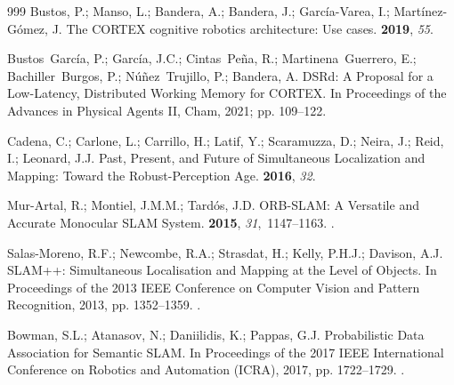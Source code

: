 \documentclass[10pt,a4paper]{article}
\begin{document}
\begin{thebibliography}{999}
Bustos, P.; Manso, L.; Bandera, A.; Bandera, J.; García-Varea, I.;
  Martínez-Gómez, J.
\newblock The {CORTEX} cognitive robotics architecture: {Use} cases.
 {\bf 2019}, {\em 55}.

Bustos~García, P.; Garc{\'i}a, J.C.; Cintas~Peña, R.; Martinena~Guerrero, E.;
  Bachiller~Burgos, P.; Núñez~Trujillo, P.; Bandera, A.
\newblock DSRd: A Proposal for a Low-Latency, Distributed Working Memory for
  CORTEX.
\newblock In Proceedings of the Advances in Physical Agents II, Cham,  2021;
  pp. 109--122.

Cadena, C.; Carlone, L.; Carrillo, H.; Latif, Y.; Scaramuzza, D.; Neira, J.;
  Reid, I.; Leonard, J.J.
\newblock Past, Present, and Future of Simultaneous Localization and Mapping:
  Toward the Robust-Perception Age.
 {\bf 2016}, {\em 32}.

Mur-Artal, R.; Montiel, J.M.M.; Tardós, J.D.
\newblock ORB-SLAM: A Versatile and Accurate Monocular SLAM System.
 {\bf 2015}, {\em 31},~1147--1163.
.

Salas-Moreno, R.F.; Newcombe, R.A.; Strasdat, H.; Kelly, P.H.J.; Davison, A.J.
\newblock SLAM++: Simultaneous Localisation and Mapping at the Level of
  Objects.
\newblock In Proceedings of the 2013 IEEE Conference on Computer Vision and
  Pattern Recognition,  2013, pp. 1352--1359.
.

Bowman, S.L.; Atanasov, N.; Daniilidis, K.; Pappas, G.J.
\newblock Probabilistic Data Association for Semantic SLAM.
\newblock In Proceedings of the 2017 IEEE International Conference on Robotics
  and Automation (ICRA),  2017, pp. 1722--1729.
.


\end{thebibliography}
\end{document}
